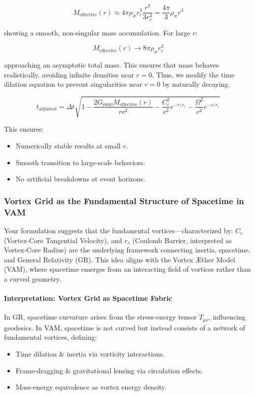 \documentclass[a4paper,10pt]{article}
\begin{document}
\begin{equation*}
    M_\text{effective}(r) \approx 4\pi \rho_\text{\ae} r_c^3 \frac{r^3}{3 r_c^3} = \frac{4\pi}{3} \rho_\text{\ae} r^3
\end{equation*}

showing a smooth, non-singular mass accumulation. For large $r$:

\begin{equation*}
    M_\text{effective}(r) \to 8\pi \rho_\text{\ae} r_c^3
\end{equation*}

approaching an asymptotic total mass. This ensures that mass behaves realistically, avoiding infinite densities near $r=0$. Thus, we modify the time dilation equation to prevent singularities near $r = 0$ by naturally decaying.

\begin{equation*}
    \boxed{t_\text{adjusted} = \Delta t \sqrt{1 - \frac{2  G_\text{swirl} M_\text{effective}(r)}{r c^2} - \frac{C_e^2}{c^2} e^{-r/r_c} - \frac{\Omega^2}{c^2} e^{-r/r_c}}}
\end{equation*}

This ensures:
\begin{itemize}
    \item Numerically stable results at small $r$.
    \item Smooth transition to large-scale behaviors.
    \item No artificial breakdowns at event horizons.
\end{itemize}




\subsubsection*{Vortex Grid as the Fundamental Structure of Spacetime in VAM}
Your formulation suggests that the fundamental vortices—characterized by:
$C_e$ (Vortex-Core Tangential Velocity), and
$r_c$ (Coulomb Barrier, interpreted as Vortex-Core Radius)
are the underlying framework connecting inertia, spacetime, and General Relativity (GR). This idea aligns with the Vortex Æther Model (VAM), where spacetime emerges from an interacting field of vortices rather than a curved geometry.

\paragraph{Interpretation: Vortex Grid as Spacetime Fabric}
In GR, spacetime curvature arises from the stress-energy tensor $T_{\mu\nu}$, influencing geodesics.
In VAM, spacetime is not curved but instead consists of a network of fundamental vortices, defining:
\begin{itemize}
    \item Time dilation \& inertia via vorticity interactions.
    \item Frame-dragging \& gravitational lensing via circulation effects.
    \item Mass-energy equivalence as vortex energy density.
\end{itemize}
\end{document}
